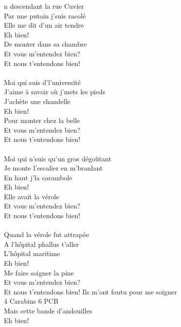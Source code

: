 
n descendant la rue Cuvier \bissimple
\\Par une putain j'suis racolé \bissimple
\\ Elle me dit d'un air tendre
\\Eh bien!
\\De monter dans sa chambre
\\Et vous m'entendez bien?
\\Et nous t'entendons bien!
\\\\Moi qui suis d'l'université \bissimple
\\J'aime à savoir où j'mets les pieds \bissimple
\\J'achète une chandelle
\\Eh bien!
\\Pour monter chez la belle
\\Et vous m'entendez bien?
\\Et nous t'entendons bien!
\\\\Moi qui n'suis qu'un gros dégoûtant \bissimple
\\Je monte l'escalier en m'branlant \bissimple
\\En haut j'la carambole
\\Eh bien!
\\Elle avait la vérole
\\Et vous m'entendez bien?
\\Et nous t'entendons bien!
\\\\Quand la vérole fut attrapée \bissimple
\\A l'hôpital phallus t'aller \bissimple
\\L'hôpital maritime
\\Eh bien!
\\Me faire soigner la pine
\\Et vous m'entendez bien?
\\Et nous t'entendons bien!
\breakpage
Ils m'ont foutu pour me soigner \bissimple
\\4 Carabins 6 PCB \bissimple
\\Mais cette bande d'andouilles
\\Eh bien!
